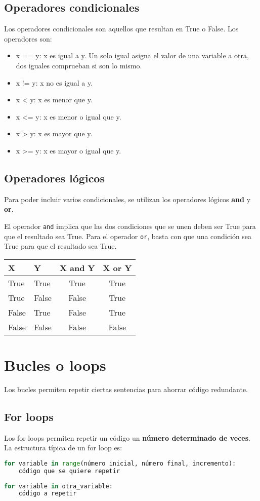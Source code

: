 \subsection{Operadores condicionales}
Los operadores condicionales son aquellos que resultan en True o False. Los operadores son:
\begin{itemize}
\item x == y: x es igual a y. Un solo igual asigna el valor de una variable a otra, dos iguales comprueban si son lo mismo.
\item x != y: x no es igual a y.
\item x < y: x es menor que y.
\item x <= y: x es menor o igual que y.
\item x > y: x es mayor que y.
\item x >= y: x es mayor o igual que y. 
\end{itemize}

\subsection{Operadores lógicos}
Para poder incluir varios condicionales, se utilizan los operadores lógicos \textbf{and} y \textbf{or}. 

El operador \texttt{and} implica que las dos condiciones que se unen deben ser True para que el resultado sea True. Para el operador \texttt{or}, basta con que una condición sea True para que el resultado sea True.
\begin{table}[htbp]
	\centering
	\begin{tabularx}{0.5\textwidth}{XXcc}
	X & Y & X and Y & X or Y \\ \hline
	True & True & True & True \\
	True & False & False & True \\
	False & True & False & True \\
	False & False & False & False
	\end{tabularx}
\end{table}

\section{Bucles o loops}
Los bucles permiten repetir ciertas sentencias para ahorrar código redundante. 

\subsection{For loops}
Los for loops permiten repetir un código un \textbf{número determinado de veces}. La estructura típica de un for loop es:
\begin{lstlisting}[language=Python]
for variable in range(número inicial, número final, incremento):
	código que se quiere repetir
	
for variable in otra_variable:
	código a repetir
\end{lstlisting}

